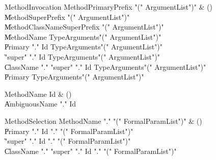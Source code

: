 \begin{bbgrammar}

MethodInvocation \label{prod:MethodInvocation}  \: MethodPrimaryPrefix \xcd"(" ArgumentList\opt \xcd")" & () \\

    \| MethodSuperPrefix \xcd"(" ArgumentList\opt \xcd")" \\
    \| MethodClassNameSuperPrefix \xcd"(" ArgumentList\opt \xcd")" \\
    \| MethodName TypeArguments\opt \xcd"(" ArgumentList\opt \xcd")" \\
    \| Primary \xcd"." Id TypeArguments\opt \xcd"(" ArgumentList\opt \xcd")" \\
    \| \xcd"super" \xcd"." Id TypeArguments\opt \xcd"(" ArgumentList\opt \xcd")" \\
    \| ClassName \xcd"." \xcd"super"  \xcd"." Id TypeArguments\opt \xcd"(" ArgumentList\opt \xcd")" \\
    \| Primary TypeArguments\opt \xcd"(" ArgumentList\opt \xcd")" \\

\end{bbgrammar}

\begin{bbgrammar}

MethodName \label{prod:MethodName}  \: Id & () \\

    \| AmbiguousName \xcd"." Id \\

\end{bbgrammar}

\begin{bbgrammar}

MethodSelection \label{prod:MethodSelection}  \: MethodName \xcd"." \xcd"(" FormalParamList\opt \xcd")" & () \\

    \| Primary \xcd"." Id \xcd"." \xcd"(" FormalParamList\opt \xcd")" \\
    \| \xcd"super" \xcd"." Id \xcd"." \xcd"(" FormalParamList\opt \xcd")" \\
    \| ClassName \xcd"." \xcd"super"  \xcd"." Id \xcd"." \xcd"(" FormalParamList\opt \xcd")" \\

\end{bbgrammar}

